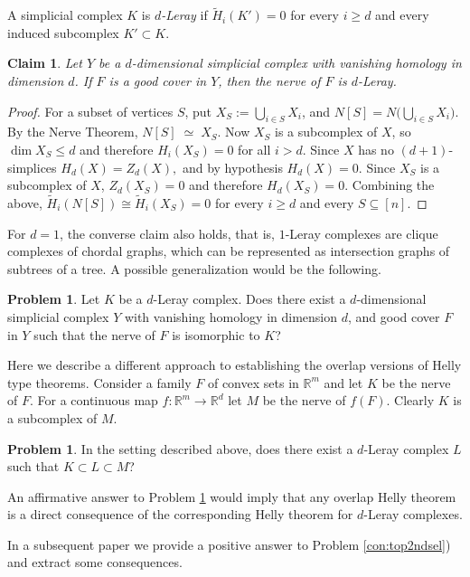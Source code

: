 \documentclass[12pt,a4paper,oneside]{amsart}\sloppy
\newtheorem{claim}[theorem]{Claim}
\theoremstyle{definition}
\newtheorem{problem}[theorem]{Problem}
\begin{document}
A simplicial complex $K$ is \emph{$d$-Leray} if $\tilde H_i(K') = 0$ for every $i\geq d$ and every induced subcomplex $K'\subset K$. 

\begin{claim} Let $Y$ be a $d$-dimensional simplicial complex with vanishing homology in dimension $d$. If $F$ is a good cover in $Y$, then the nerve of $F$ is $d$-Leray.
\end{claim} 

\begin{proof}
For a subset of vertices $S$, put \(X_S := \bigcup_{i\in S} X_i\), and
\(
N[S] = N\big(\textstyle\bigcup_{i \in S}X_i\big).
\)
By the Nerve Theorem,
\(
N[S] \;\simeq\; X_S.
\)
Now $X_S$ is a subcomplex of $X$, so $\dim X_S \le d$ and therefore $H_i(X_S) = 0$ for all $i > d$.
Since $X$ has no $(d{+}1)$-simplices
\(
H_d(X) = Z_d(X) ,
\)
and by hypothesis $H_d(X)=0$. Since $X_S$ is a subcomplex of $X$, $Z_d(X_S) = 0$ and therefore $H_d(X_S)=0$.
Combining the above, $\tilde H_i(N[S]) \cong \tilde H_i(X_S) = 0$ for every
$i \ge d$ and every $S \subseteq [n]$. 
\end{proof}

For $d=1$, the converse claim also holds, that is, $1$-Leray complexes are clique complexes of chordal graphs, which can be represented as intersection graphs of subtrees of a tree. A possible generalization would be the following.

\begin{problem} Let $K$ be a $d$-Leray complex. Does there exist a $d$-dimensional simplicial complex $Y$ with vanishing homology in dimension $d$, and good cover $F$ in $Y$ such that the nerve of $F$ is isomorphic to $K$?
\end{problem}

Here we describe a different approach to establishing the overlap versions of Helly type theorems. Consider a family $F$ of convex sets in $\mathbb{R}^m$ and let $K$ be the nerve of $F$. For a continuous map $f: \mathbb{R}^m \to \mathbb{R}^d$ let $M$ be the nerve of $f(F)$. Clearly $K$ is a subcomplex of $M$. 

\begin{problem}\label{con:Leray Sandwich}
In the setting described above, does there exist a $d$-Leray complex $L$ such that $K\subset L \subset M$?
\end{problem}

An affirmative answer to Problem \ref{con:Leray Sandwich} would imply that any overlap Helly theorem is a direct consequence of the corresponding Helly theorem for $d$-Leray complexes. 

In a subsequent paper we provide a positive answer to Problem \ref{con:top2ndsel}) and extract some consequences. 







\end{document}
